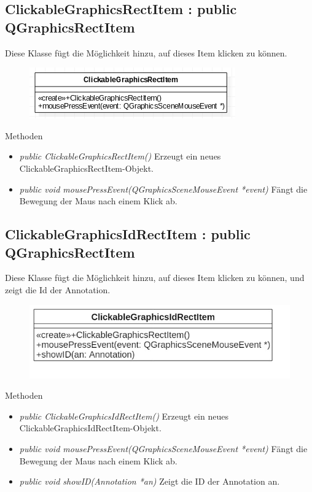 \subsection*{ClickableGraphicsRectItem : public QGraphicsRectItem}
Diese Klasse fügt die Möglichkeit hinzu, auf dieses Item klicken zu können.

\begin{figure}[H]
	\centering
	\includegraphics[scale=0.5]{img/Klassendiagramm/Klassen/View/ClickableGraphicsRectItem}
	\label{fig:clickableGraphicsRectItem}
\end{figure}

Methoden
\begin{itemize}
	\item\textit{public ClickableGraphicsRectItem()}
	Erzeugt ein neues ClickableGraphicsRectItem-Objekt.
	\item\textit{public void mousePressEvent(QGraphicsSceneMouseEvent *event)}
	Fängt die Bewegung der Maus nach einem Klick ab.
\end{itemize}

\subsection*{ClickableGraphicsIdRectItem : public QGraphicsRectItem}
Diese Klasse fügt die Möglichkeit hinzu, auf dieses Item klicken zu können, und zeigt die Id der \gls{Annotation}.

\begin{figure}[H]
	\centering
	\includegraphics[scale=0.5]{img/Klassendiagramm/Klassen/View/ClickableGraphicsIdRectItem}
	\label{fig:clickableGraphicsIdRectItem}
\end{figure}

Methoden
\begin{itemize}
	\item\textit{public ClickableGraphicsIdRectItem()}
	Erzeugt ein neues ClickableGraphicsIdRectItem-Objekt.
	\item\textit{public void mousePressEvent(QGraphicsSceneMouseEvent *event)}
	Fängt die Bewegung der Maus nach einem Klick ab.
	\item\textit{public void showID(Annotation *an)}
	Zeigt die ID der \gls{Annotation} an.
\end{itemize}


